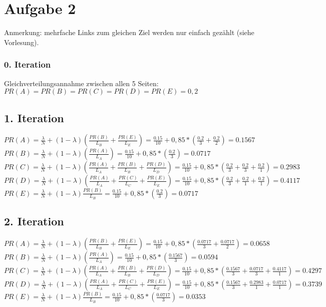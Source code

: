 \section*{Aufgabe 2}
Anmerkung: mehrfache Links zum gleichen Ziel werden nur einfach gezählt (siehe Vorlesung).
\subsubsection*{0. Iteration}
Gleichverteilungsannahme zwischen allen 5 Seiten:
$PR(A) = PR(B) = PR(C) = PR(D) = PR(E) = 0,2$

\subsection*{1. Iteration}
$PR(A) = \frac{\lambda}{N} + (1-\lambda)  (\frac{PR(B)}{L_{B}} + \frac{PR(E)}{L_{E}}) = \frac{0.15}{10} + 0,85 * (\frac{0.2}{3} + \frac{0.2}{2}) = 0.1567$ 
\\
$PR(B) = \frac{\lambda}{N} + (1-\lambda)  (\frac{PR(A)}{L_{A}}) = \frac{0.15}{10} + 0,85 * (\frac{0.2}{3}) = 0.0717$
\\
$PR(C) = \frac{\lambda}{N} + (1-\lambda)  (\frac{PR(A)}{L_{A}} + \frac{PR(B)}{L_{B}} + \frac{PR(D)}{L_{D}}) = \frac{0.15}{10} + 0,85 * (\frac{0.2}{3} + \frac{0.2}{3} + \frac{0.2}{1}) = 0.2983$ 
\\ 
$PR(D) = \frac{\lambda}{N} + (1-\lambda)  (\frac{PR(A)}{L_{A}} + \frac{PR(C)}{L_{C}} + \frac{PR(E)}{L_{E}}) = \frac{0.15}{10} + 0,85 * (\frac{0.2}{3} + \frac{0.2}{1} + \frac{0.2}{1}) = 0.4117$ 
\\
$PR(E) = \frac{\lambda}{N} + (1-\lambda)  \frac{PR(B)}{L_{B}} = \frac{0.15}{10} + 0,85 * (\frac{0.2}{3}) = 0.0717$

\subsection*{2. Iteration}
 $PR(A) = \frac{\lambda}{N} + (1-\lambda)  (\frac{PR(B)}{L_{B}} + \frac{PR(E)}{L_{E}}) = \frac{0.15}{10} + 0,85 * (\frac{0.0717}{3} + \frac{0.0717}{2}) = 0.0658$ 
\\
$PR(B) = \frac{\lambda}{N} + (1-\lambda)  (\frac{PR(A)}{L_{A}}) = \frac{0.15}{10} + 0,85 * (\frac{0.1567}{3}) = 0.0594$
\\
$PR(C) = \frac{\lambda}{N} + (1-\lambda)  (\frac{PR(A)}{L_{A}} + \frac{PR(B)}{L_{B}} + \frac{PR(D)}{L_{D}}) = \frac{0.15}{10} + 0,85 * (\frac{0.1567}{3} + \frac{0.0717}{3} + \frac{0.4117}{1}) = 0.4297$ 
\\ 
$PR(D) = \frac{\lambda}{N} + (1-\lambda)  (\frac{PR(A)}{L_{A}} + \frac{PR(C)}{L_{C}} + \frac{PR(E)}{L_{E}}) = \frac{0.15}{10} + 0,85 * (\frac{0.1567}{3} + \frac{0.2983}{1} + \frac{0.0717}{1}) = 0.3739$ 
\\
$PR(E) = \frac{\lambda}{N} + (1-\lambda)  \frac{PR(B)}{L_{B}} = \frac{0.15}{10} + 0,85 * (\frac{0.0717}{3}) = 0.0353$

